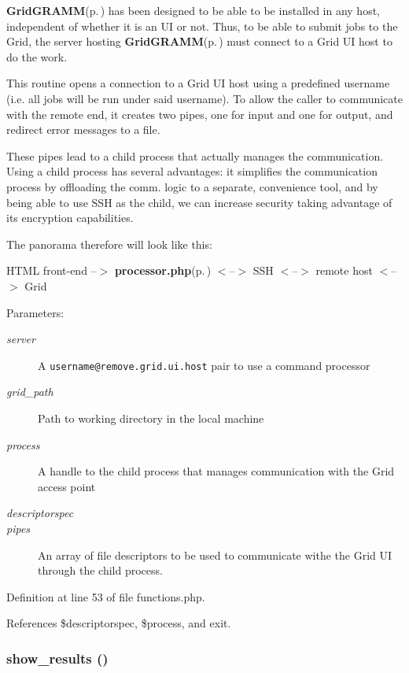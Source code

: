 {\bf Grid\-GRAMM}{\rm (p.\,\pageref{namespaceGridGRAMM})} has been designed to be able to be installed in any host, independent of whether it is an UI or not. Thus, to be able to submit jobs to the Grid, the server hosting {\bf Grid\-GRAMM}{\rm (p.\,\pageref{namespaceGridGRAMM})} must connect to a Grid UI host to do the work.

This routine opens a connection to a Grid UI host using a predefined username (i.e. all jobs will be run under said username). To allow the caller to communicate with the remote end, it creates two pipes, one for input and one for output, and redirect error messages to a file.

These pipes lead to a child process that actually manages the communication. Using a child process has several advantages: it simplifies the communication process by offloading the comm. logic to a separate, convenience tool, and by being able to use SSH as the child, we can increase security taking advantage of its encryption capabilities.

The panorama therefore will look like this:

HTML front-end --$>$ {\bf processor.php}{\rm (p.\,\pageref{processor_8php})} $<$--$>$ SSH $<$--$>$ remote host $<$--$>$ Grid

\begin{Desc}
\item[Parameters:]
\begin{description}
\item[{\em server}]A {\tt username@remove.grid.ui.host} pair to use a command processor \item[{\em grid\_\-path}]Path to working directory in the local machine \item[{\em process}]A handle to the child process that manages communication with the Grid access point \item[{\em descriptorspec}]\item[{\em pipes}]An array of file descriptors to be used to communicate withe the Grid UI through the child process. \end{description}
\end{Desc}


Definition at line 53 of file functions.php.

References \$descriptorspec, \$process, and exit.
\subsubsection{\setlength{\rightskip}{0pt plus 5cm}show\_\-results ()}\label{functions_8php_a11}


